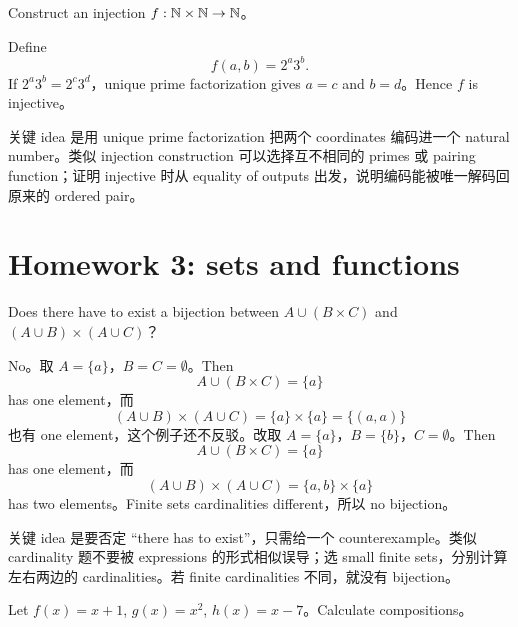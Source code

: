 \begin{exerciseblock}
Construct an injection \(f:\mathbb{N}\times\mathbb{N}\to\mathbb{N}\)。
\end{exerciseblock}

\begin{solution}
Define
\[
f(a,b)=2^a3^b.
\]
If \(2^a3^b=2^c3^d\)，unique prime factorization gives \(a=c\) and \(b=d\)。Hence \(f\) is injective。
\end{solution}

\begin{explanation}
关键 idea 是用 unique prime factorization 把两个 coordinates 编码进一个 natural number。类似 injection construction 可以选择互不相同的 primes 或 pairing function；证明 injective 时从 equality of outputs 出发，说明编码能被唯一解码回原来的 ordered pair。
\end{explanation}

\section{Homework 3: sets and functions}

\begin{exerciseblock}
Does there have to exist a bijection between \(A\cup(B\times C)\) and \((A\cup B)\times(A\cup C)\)？
\end{exerciseblock}

\begin{solution}
No。取 \(A=\{a\}\)，\(B=C=\emptyset\)。Then
\[
A\cup(B\times C)=\{a\}
\]
has one element，而
\[
(A\cup B)\times(A\cup C)=\{a\}\times\{a\}=\{(a,a)\}
\]
也有 one element，这个例子还不反驳。改取 \(A=\{a\}\)，\(B=\{b\}\)，\(C=\emptyset\)。Then
\[
A\cup(B\times C)=\{a\}
\]
has one element，而
\[
(A\cup B)\times(A\cup C)=\{a,b\}\times\{a\}
\]
has two elements。Finite sets cardinalities different，所以 no bijection。
\end{solution}

\begin{explanation}
关键 idea 是要否定 ``there has to exist''，只需给一个 counterexample。类似 cardinality 题不要被 expressions 的形式相似误导；选 small finite sets，分别计算左右两边的 cardinalities。若 finite cardinalities 不同，就没有 bijection。
\end{explanation}

\begin{exerciseblock}
Let \(f(x)=x+1\), \(g(x)=x^2\), \(h(x)=x-7\)。Calculate compositions。
\end{exerciseblock}

